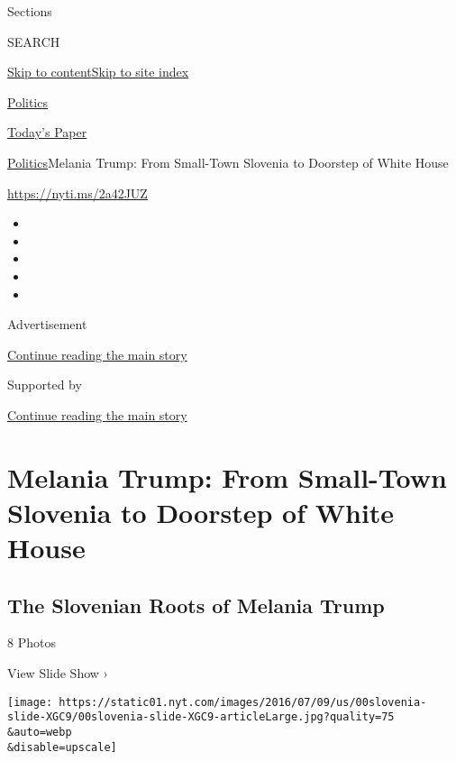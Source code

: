 Sections

SEARCH

\protect\hyperlink{site-content}{Skip to
content}\protect\hyperlink{site-index}{Skip to site index}

\href{https://www.nytimes.com/section/politics}{Politics}

\href{https://myaccount.nytimes.com/auth/login?response_type=cookie\&client_id=vi}{}

\href{https://www.nytimes.com/section/todayspaper}{Today's Paper}

\href{/section/politics}{Politics}\textbar{}Melania Trump: From
Small-Town Slovenia to Doorstep of White House

\url{https://nyti.ms/2a42JUZ}

\begin{itemize}
\item
\item
\item
\item
\item
\end{itemize}

Advertisement

\protect\hyperlink{after-top}{Continue reading the main story}

Supported by

\protect\hyperlink{after-sponsor}{Continue reading the main story}

\hypertarget{melania-trump-from-small-town-slovenia-to-doorstep-of-white-house}{%
\section{Melania Trump: From Small-Town Slovenia to Doorstep of White
House}\label{melania-trump-from-small-town-slovenia-to-doorstep-of-white-house}}

\href{https://www.nytimes.com/slideshow/2016/07/09/us/the-slovenian-roots-of-melania-trump.html}{}

\hypertarget{the-slovenian-roots-of-melania-trump}{%
\subsection{The Slovenian Roots of Melania
Trump}\label{the-slovenian-roots-of-melania-trump}}

8 Photos

View Slide Show ›

\texttt{[image: https://static01.nyt.com/images/2016/07/09/us/00slovenia-slide-XGC9/00slovenia-slide-XGC9-articleLarge.jpg?quality=75\\\&auto=webp\\\&disable=upscale]}

